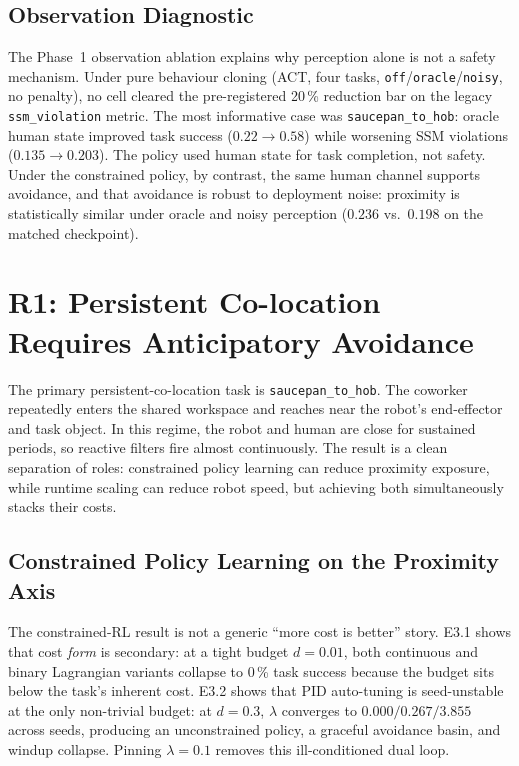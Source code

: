 \documentclass[11pt,a4paper]{report}
\begin{document}
\subsection{Observation Diagnostic}
\label{sec:results:obs}
\label{sec:results:obs-bc}
\label{sec:results:obs-rl}

The Phase~1 observation ablation explains why perception alone is not a
safety mechanism. Under pure behaviour cloning (ACT, four tasks,
\texttt{off}/\texttt{oracle}/\texttt{noisy}, no penalty), no cell
cleared the pre-registered 20\,\% reduction bar on the legacy
\texttt{ssm\_violation} metric. The most informative case was
\texttt{saucepan\_to\_hob}: oracle human state improved task success
($0.22\rightarrow0.58$) while worsening SSM violations
($0.135\rightarrow0.203$). The policy used human state for task
completion, not safety. Under the constrained policy, by contrast, the
same human channel supports avoidance, and that avoidance is robust to
deployment noise: proximity is statistically similar under oracle and
noisy perception ($0.236$ vs.\ $0.198$ on the matched checkpoint).

\section{R1: Persistent Co-location Requires Anticipatory Avoidance}
\label{sec:results:persistent}

The primary persistent-co-location task is
\texttt{saucepan\_to\_hob}. The coworker repeatedly enters the shared
workspace and reaches near the robot's end-effector and task object.
In this regime, the robot and human are close for sustained periods, so
reactive filters fire almost continuously. The result is a clean
separation of roles: constrained policy learning can reduce proximity
exposure, while runtime scaling can reduce robot speed, but achieving
both simultaneously stacks their costs.

\subsection{Constrained Policy Learning on the Proximity Axis}
\label{sec:results:cost-signal}
\label{sec:results:budget}
\label{sec:results:headline-feature-table}

The constrained-RL result is not a generic ``more cost is better''
story. E3.1 shows that cost \emph{form} is secondary: at a tight budget
$d=0.01$, both continuous and binary Lagrangian variants collapse to
0\,\% task success because the budget sits below the task's inherent
cost. E3.2 shows that PID auto-tuning is seed-unstable at the only
non-trivial budget: at $d=0.3$, $\lambda$ converges to
$0.000/0.267/3.855$ across seeds, producing an unconstrained policy, a
graceful avoidance basin, and windup collapse. Pinning
$\lambda=0.1$ removes this ill-conditioned dual loop.
\end{document}
